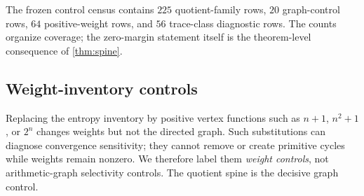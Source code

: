 The frozen control census contains \(225\) quotient-family rows, \(20\)
graph-control rows, \(64\) positive-weight rows, and \(56\) trace-class
diagnostic rows.  The counts organize coverage; the zero-margin statement
itself is the theorem-level consequence of \cref{thm:spine}.

\subsection{Weight-inventory controls}

Replacing the entropy inventory by positive vertex functions such as
\(n+1\), \(n^2+1\), or \(2^n\) changes weights but not the directed graph.
Such substitutions can diagnose convergence sensitivity; they cannot remove
or create primitive cycles while weights remain nonzero.  We therefore label
them \emph{weight controls}, not arithmetic-graph selectivity controls.  The
quotient spine is the decisive graph control.
